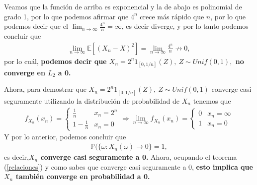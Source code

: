 \documentclass[11pt,letterpaper]{article}
\newcommand{\mP}{\mathbb{P}}
\newcommand{\mE}{\mathbb{E}}
\begin{document}
Veamos que la función de arriba es exponencial y la de abajo es polinomial de grado 1, por lo que podemos afirmar que $4^n$ crece más rápido que $n$, por lo que podemos decir que el $\lim_{n\rightarrow \infty} \frac{4^n}{n}=\infty$, es decir diverge, y por lo tanto podemos concluir que 
\begin{align*}
\lim_{n\rightarrow \infty}\mE[\left(X_n-X \right)^2]=\lim_{n\rightarrow \infty}\frac{4^n}{n}\not\rightarrow 0,
\end{align*}
por lo cuál, \textbf{podemos decir que $X_n=2^n 1_{[0,1/n]}(Z),\ Z\sim Unif(0,1),$ no converge en $L_2$ a 0.}

Ahora, para demostrar que $X_n=2^n 1_{[0,1/n]}(Z),\ Z\sim Unif(0,1)$ converge casi seguramente utilizando la distribución de probabilidad de $X_n$ tenemos que 
\begin{align*}
f_{X_n}(x_n)= \left\{\begin{array}{cc}
\frac{1}{n} & x_n=2^n\\
1-\frac{1}{n} & x_n=0
\end{array} \right. \Rightarrow \lim_{n\rightarrow \infty}f_{X_n}(x_n)= \left\{\begin{array}{cc}
0 & x_n=\infty \\
1 & x_n=0
\end{array} \right.
\end{align*}
Y por lo anterior, podemos concluir que 
\begin{align*}
\mP(\{\omega: X_n(\omega) \rightarrow 0 \}=1,
\end{align*}
es decir,\textbf{$X_n$ converge casi seguramente a 0. } Ahora, ocupando el teorema (\ref{relaciones}) y como sabes que converge casi seguramente a 0, \textbf{esto implica que $X_n$ también converge en probabilidad a 0.}
\end{document}
